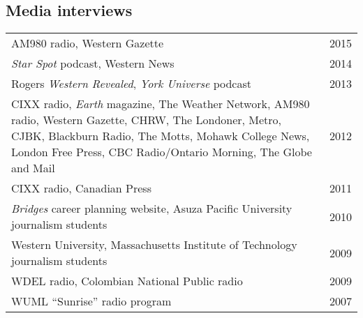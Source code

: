 \documentclass[12pt]{article}
\begin{document}
\subsection{Media interviews}
\begin{tabularx}{\textwidth}{Xr}
AM980 radio, Western Gazette & 2015\\
{\em Star Spot} podcast, Western News & 2014\\
Rogers {\em Western Revealed}, {\em York Universe} podcast & 2013\\
CIXX radio, {\em Earth} magazine, The Weather Network, AM980 radio, Western Gazette, CHRW, The Londoner, Metro, CJBK, Blackburn Radio, The Motts, Mohawk College News, London Free Press, CBC Radio/Ontario Morning, The Globe and Mail& 2012\\
CIXX radio, Canadian Press&  2011\\
{\em Bridges} career planning website, Asuza Pacific University journalism students& 2010\\
Western University, Massachusetts Institute of Technology journalism students& 2009\\
WDEL radio, Colombian National Public radio & 2009\\ 
WUML ``Sunrise'' radio program & 2007\\ 
\end{tabularx}
\end{document}
